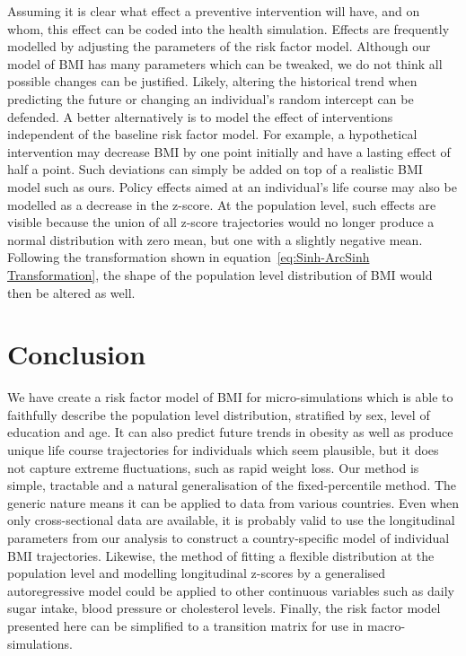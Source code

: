 \documentclass{imammb}
\numberwithin{equation}{section}
\begin{document}
Assuming it is clear what effect a preventive intervention will have, and on whom, this effect can be coded into the health simulation. Effects are frequently modelled by adjusting the parameters of the risk factor model. Although our model of BMI has many parameters which can be tweaked, we do not think all possible changes can be justified. Likely, altering the historical trend when predicting the future or changing an individual's random intercept can be defended. A better alternatively is to model the effect of interventions independent of the baseline risk factor model. For example, a hypothetical intervention may decrease BMI by one point initially and have a lasting effect of half a point. Such deviations can simply be added on top of a realistic BMI model such as ours. Policy effects aimed at an individual's life course may also be modelled as a decrease in the z-score. At the population level, such effects are visible because the union of all z-score trajectories would no longer produce a normal distribution with zero mean, but one with a slightly negative mean. Following the transformation shown in equation~\ref{eq:Sinh-ArcSinh Transformation}, the shape of the population level distribution of BMI would then be altered as well.

\section{Conclusion}
\label{sec:Conclusion}

We have create a risk factor model of BMI for micro-simulations which is able to faithfully describe the population level distribution, stratified by sex, level of education and age. It can also predict future trends in obesity as well as produce unique life course trajectories for individuals which seem plausible, but it does not capture extreme fluctuations, such as rapid weight loss. Our method is simple, tractable and a natural generalisation of the fixed-percentile method. The generic nature means it can be applied to data from various countries. Even when only cross-sectional data are available, it is probably valid to use the longitudinal parameters from our analysis to construct a country-specific model of individual BMI trajectories. Likewise, the method of fitting a flexible distribution at the population level and modelling longitudinal z-scores by a generalised autoregressive model could be applied to other continuous variables such as daily sugar intake, blood pressure or cholesterol levels. Finally, the risk factor model presented here can be simplified to a transition matrix for use in macro-simulations.
\end{document}
